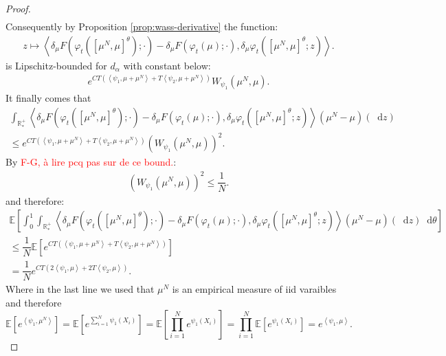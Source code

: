 \documentclass[11pt,a4paper]{article}
\newcommand{\RRP}{\mathbb{R}^+_*}
\newcommand{\red}[1]{\textcolor{red}{#1}}
\newcommand{\E}[1]{\mathbb{E}\left[#1\right]}
\newcommand{\brac}[1]{\left\langle#1\right\rangle}
\newcommand{\dd}{\mathop{}\!\mathrm{d}}
\begin{document}
\begin{proof}
\begin{multline*}
    \end{multline*}
    Consequently by Proposition \ref{prop:wass-derivative} the function: 
    \begin{align*}
         z \mapsto \brac{\delta_\mu F\left(\varphi_t \left(\left[\mu^N,\mu \right]^\theta\right);\cdot \right)- \delta_\mu F\left(\varphi_t \left(\mu\right);\cdot \right), \delta_\mu \varphi_t\left(\left[\mu^N,\mu \right]^\theta;z \right)}.
    \end{align*}
    is Lipschitz-bounded for $d_\alpha$ with constant below:
    \begin{align*}
        e^{CT\left(\brac{\psi_1,\mu + \mu^N} + T\brac{\psi_2,\mu + \mu^N}\right)}W_{\psi_1}\left( \mu^N , \mu\right).
    \end{align*}
    It finally comes that 
    \begin{multline*}
        \int_{\RRP} \brac{\delta_\mu F\left(\varphi_t \left(\left[\mu^N,\mu \right]^\theta\right);\cdot \right)- \delta_\mu F\left(\varphi_t \left(\mu\right);\cdot \right), \delta_\mu \varphi_t\left(\left[\mu^N,\mu \right]^\theta;z \right)} \left(\mu^N - \mu\right)(\dd z) \\
        \leq e^{CT\left(\brac{\psi_1,\mu + \mu^N} + T\brac{\psi_2,\mu + \mu^N}\right)} \left(W_{\psi_1}\left( \mu^N , \mu\right)\right)^2.
    \end{multline*}
    By \red{F-G, à lire pcq pas sur de ce bound.}:
    \begin{align*}
        \left(W_{\psi_1}\left( \mu^N , \mu\right)\right)^2 \leq \dfrac{1}{N}.
    \end{align*}
    and therefore:
    \begin{multline*}
        \E{\int_0^1 \int_{\RRP} \brac{\delta_\mu F\left(\varphi_t \left(\left[\mu^N,\mu \right]^\theta\right);\cdot \right)- \delta_\mu F\left(\varphi_t \left(\mu\right);\cdot \right), \delta_\mu \varphi_t\left(\left[\mu^N,\mu \right]^\theta;z \right)} \left(\mu^N - \mu\right)(\dd z)\dd \theta} \\
        \leq \dfrac{1}{N}\E{e^{CT\left(\brac{\psi_1,\mu + \mu^N} + T\brac{\psi_2,\mu + \mu^N}\right)}}\\
        = \dfrac{1}{N}e^{CT\left(2\brac{\psi_1,\mu } + 2T\brac{\psi_2,\mu}\right)}.
    \end{multline*}
    Where in the last line we used that $\mu^N$ is an empirical measure of iid varaibles and therefore
    \[ \E{e^{\brac{\psi_1,\mu^N}}}  = \E{ e^{\sum\limits_{i = 1}^N \psi_1(X_i)}} = \E{\prod\limits_{i = 1}^N e^{\psi_1(X_i)}} = \prod\limits_{i = 1}^N \E{e^{\psi_1(X_i)}} = e^{\brac{\psi_1,\mu}}.  \]
\end{proof}
\end{document}

